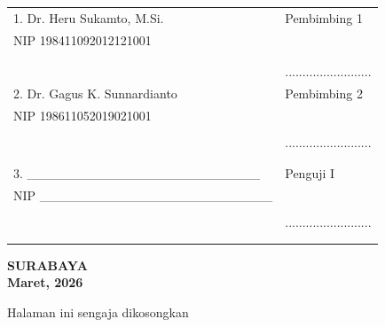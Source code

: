 \begin{center}
\noindent
\begin{tabularx}{\textwidth}{X l}
	1. Dr. Heru Sukamto, M.Si.     & Pembimbing 1 \\
	NIP 198411092012121001       &  \\
	&  \\
	&  \\
	&.........................  \\
	2. Dr. Gagus K. Sunnardianto   & Pembimbing 2\\
	NIP 198611052019021001 	& \\
	&  \\
	& ......................... \\
	&  \\
	&  \\
	3. \_\_\_\_\_\_\_\_\_\_\_\_\_\_\_\_\_\_\_\_\_\_\_\_\_ & Penguji I \\
	NIP \_\_\_\_\_\_\_\_\_\_\_\_\_\_\_\_\_\_\_\_\_\_\_\_\_      & \\
        &  \\
	& ......................... \\
        &  \\
	&  \\
\end{tabularx}
\endgroup
  \begin{center}
	\textbf{SURABAYA\\Maret, 2026}
\end{center}
\end{center}

\newpage
\thispagestyle{empty}
\vspace*{\fill}
    \begin{center}
	Halaman ini sengaja dikosongkan
    \end{center}
\vspace*{\fill}
\pagebreak
